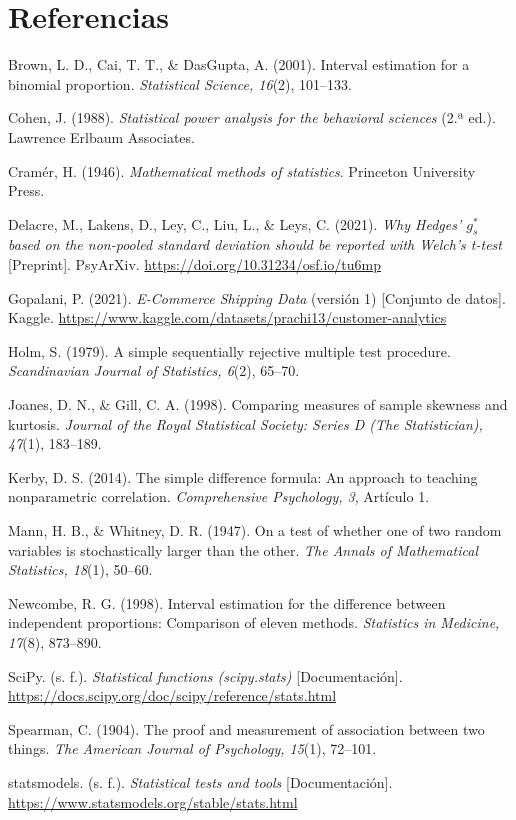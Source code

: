 \documentclass[10pt,a4paper]{article}
\begin{document}
\section*{Referencias}\small
Brown, L. D., Cai, T. T., \& DasGupta, A. (2001). Interval estimation for a binomial proportion. \emph{Statistical Science, 16}(2), 101--133.

Cohen, J. (1988). \emph{Statistical power analysis for the behavioral sciences} (2.ª ed.). Lawrence Erlbaum Associates.

Cramér, H. (1946). \emph{Mathematical methods of statistics}. Princeton University Press.

Delacre, M., Lakens, D., Ley, C., Liu, L., \& Leys, C. (2021). \emph{Why Hedges' $g^*_s$ based on the non-pooled standard deviation should be reported with Welch's t-test} [Preprint]. PsyArXiv. \url{https://doi.org/10.31234/osf.io/tu6mp}

Gopalani, P. (2021). \emph{E-Commerce Shipping Data} (versión 1) [Conjunto de datos]. Kaggle. \url{https://www.kaggle.com/datasets/prachi13/customer-analytics}

Holm, S. (1979). A simple sequentially rejective multiple test procedure. \emph{Scandinavian Journal of Statistics, 6}(2), 65--70.

Joanes, D. N., \& Gill, C. A. (1998). Comparing measures of sample skewness and kurtosis. \emph{Journal of the Royal Statistical Society: Series D (The Statistician), 47}(1), 183--189.

Kerby, D. S. (2014). The simple difference formula: An approach to teaching nonparametric correlation. \emph{Comprehensive Psychology, 3}, Artículo 1.

Mann, H. B., \& Whitney, D. R. (1947). On a test of whether one of two random variables is stochastically larger than the other. \emph{The Annals of Mathematical Statistics, 18}(1), 50--60.

Newcombe, R. G. (1998). Interval estimation for the difference between independent proportions: Comparison of eleven methods. \emph{Statistics in Medicine, 17}(8), 873--890.

SciPy. (s. f.). \emph{Statistical functions (scipy.stats)} [Documentación]. \url{https://docs.scipy.org/doc/scipy/reference/stats.html}

Spearman, C. (1904). The proof and measurement of association between two things. \emph{The American Journal of Psychology, 15}(1), 72--101.

statsmodels. (s. f.). \emph{Statistical tests and tools} [Documentación]. \url{https://www.statsmodels.org/stable/stats.html}
\end{document}
